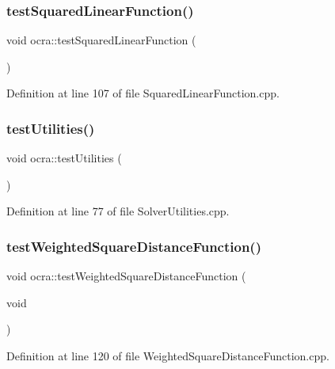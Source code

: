 \hypertarget{namespaceocra_a6af256e0684d15c6a7f8d485b3c78883}{}\label{namespaceocra_a6af256e0684d15c6a7f8d485b3c78883} 
\subsubsection{\texorpdfstring{test\+Squared\+Linear\+Function()}{testSquaredLinearFunction()}}
{\footnotesize\ttfamily void ocra\+::test\+Squared\+Linear\+Function (\begin{DoxyParamCaption}{ }\end{DoxyParamCaption})}



Definition at line 107 of file Squared\+Linear\+Function.\+cpp.

\hypertarget{namespaceocra_a3dca8b5c0944fb95ccafa4b41d169d70}{}\label{namespaceocra_a3dca8b5c0944fb95ccafa4b41d169d70} 
\subsubsection{\texorpdfstring{test\+Utilities()}{testUtilities()}}
{\footnotesize\ttfamily void ocra\+::test\+Utilities (\begin{DoxyParamCaption}{ }\end{DoxyParamCaption})}



Definition at line 77 of file Solver\+Utilities.\+cpp.

\hypertarget{namespaceocra_a6bfd3e6e97c1117101ce2cc1c4f91536}{}\label{namespaceocra_a6bfd3e6e97c1117101ce2cc1c4f91536} 
\subsubsection{\texorpdfstring{test\+Weighted\+Square\+Distance\+Function()}{testWeightedSquareDistanceFunction()}}
{\footnotesize\ttfamily void ocra\+::test\+Weighted\+Square\+Distance\+Function (\begin{DoxyParamCaption}\item[{void}]{ }\end{DoxyParamCaption})}



Definition at line 120 of file Weighted\+Square\+Distance\+Function.\+cpp.

